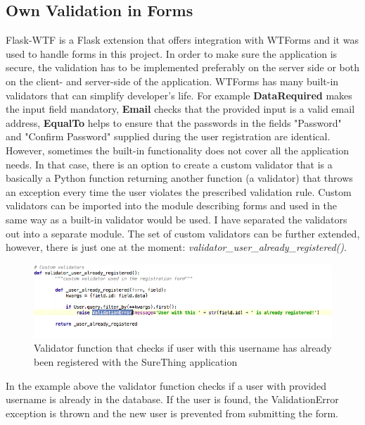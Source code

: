\subsection{Own Validation in Forms}
Flask-WTF is a Flask extension that offers integration with WTForms and it was used to handle forms in this project. In order to make sure the application is secure, the validation has to be implemented preferably on the server side or both on the client- and server-side of the application. WTForms has many built-in validators that can simplify developer's life. For example \textbf{DataRequired} makes the input field mandatory, \textbf{Email} checks that the provided input is a valid email address, \textbf{EqualTo} helps to ensure that the passwords in the fields "Password" and "Confirm Password" supplied during the user registration are identical. However, sometimes the built-in functionality does not cover all the application needs. In that case, there is an option to create a custom validator that is a basically a Python function returning another function (a validator) that throws an exception every time the user violates the prescribed validation rule. Custom validators can be imported into the module describing forms and used in the same way as a built-in validator would be used. I have separated the validators out into a separate module. The set of custom validators can be further extended, however, there is just one at the moment: \emph{validator\_user\_already\_registered()}. 

\begin{figure}[H]
	\begin{center}
		\includegraphics[width=.90\linewidth,natwidth=610,natheight=642]{impl/images/customValidator}
		\caption{Validator function that checks if user with this username has already been registered with the SureThing application} \label{fig:using:customValidator}
	\end{center}
\end{figure}

In the example above the validator function checks if a user with provided username is already in the database. If the user is found, the ValidationError exception is thrown and the new user is prevented from submitting the form.

